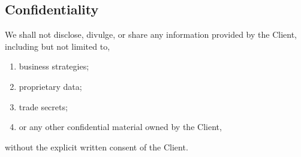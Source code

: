\documentclass{article}
\begin{document}
\subsection{Confidentiality}
We shall not disclose, divulge, or share any information provided by the Client, including but not limited to,
\begin{enumerate}
    \item business strategies;
    \item proprietary data;
    \item trade secrets;
    \item or any other confidential material owned by the Client,
\end{enumerate}
without the explicit written consent of the Client.
\end{document}
